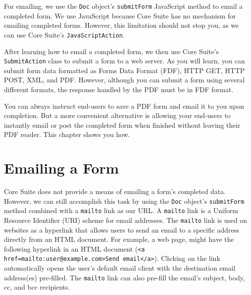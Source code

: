 \documentclass[american]{tufte-book}
\numberwithin{equation}{section}
\numberwithin{figure}{section}
\begin{document}
{{For emailing, we use the \texttt{Doc} object's \texttt{submitForm}
JavaScript method to email a completed form. We use JavaScript because
Core Suite has no mechanism for emailing completed forms. However,
this limitation should not stop you, as we can use Core Suite's \texttt{JavaScriptAction}.

After learning how to email a completed form, we then use Core Suite's
\texttt{SubmitAction} class to submit a form to a web server. As you
will learn, you can submit form data formatted as Forms Data Format
(FDF), HTTP GET, HTTP POST, XML, and PDF. However, although you can
submit a form using several different formats, the response handled
by the PDF must be in FDF format.

You can always instruct end-users to save a PDF form and email it
to you upon completion. But a more convenient alternative is allowing
your end-users to instantly email or post the completed form when
finished without leaving their PDF reader. This chapter shows you
how.

\section{Emailing a Form}

Core Suite does not provide a means of emailing a form's completed
data. However, we can still accomplish this task by using the \texttt{Doc}
object's \texttt{submitForm} method combined with a \texttt{mailto}
link as our URL. A \texttt{mailto} link is a Uniform Resource Identifier (URI) scheme
for email addresses. The \texttt{mailto} link is used on websites
as a hyperlink that allows users to send an email to a specific address
directly from an HTML document. For example, a web page, might have
the following hyperlink in an HTML document (\texttt{<a href=\textquotedbl mailto:user@example\allowbreak.com\textquotedbl >Send
email</a>}). Clicking on the link automatically opens the user's default
email client with the destination email address(es) pre-filled. The
\texttt{mailto} link can also pre-fill the email's subject, body,
cc, and bcc recipients. 

}}
\end{document}
